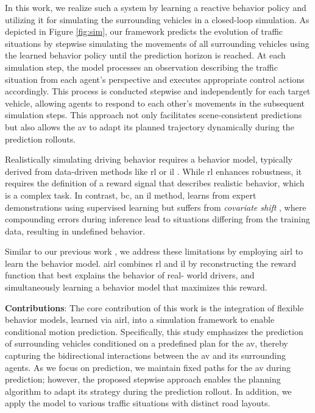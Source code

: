 \documentclass[a4paper,12pt,onecolumn]{article}
\begin{document}
In this work, we realize such a system by learning a reactive behavior policy and utilizing it for simulating the surrounding vehicles in a closed-loop simulation. 
As depicted in Figure \ref{fig:sim}, our framework predicts the evolution of traffic situations by stepwise simulating the movements of all surrounding vehicles using the learned behavior policy until the prediction horizon is reached. 
At each simulation step, the model processes an observation describing the traffic situation from each agent's perspective and executes appropriate control actions accordingly. This process is conducted stepwise and independently for each target vehicle, allowing agents to respond to each other's movements in the subsequent simulation steps. This approach not only facilitates scene-consistent predictions but also allows the \gls{av} to adapt its planned trajectory dynamically during the prediction rollouts.

Realistically simulating driving behavior requires a behavior model, typically derived from data-driven methods like \gls{rl} \cite{Konstantinidis23} or \gls{il} \cite{Sackmann22AIRL}. While \gls{rl} enhances robustness, it requires the definition of a reward signal that describes realistic behavior, which is a complex task. In contrast, \gls{bc}, an \gls{il} method, learns from expert demonstrations using supervised learning but suffers from \emph{covariate shift} \cite{Spencer21}, where compounding errors during inference lead to situations differing from the training data, resulting in undefined behavior.

Similar to our previous work \cite{Konstantinidis24AIRL}, we address these limitations by employing \gls{airl} \cite{Fu17AIRL} to learn the behavior model. \gls{airl} combines \gls{rl} and \gls{il} by reconstructing the reward function that best explains the behavior of real- world drivers, and simultaneously learning a behavior model that maximizes this reward.

\textbf{Contributions}: 
The core contribution of this work is the integration of flexible behavior models, learned via \gls{airl}, into a simulation framework to enable conditional motion prediction. Specifically, this study emphasizes the prediction of surrounding vehicles conditioned on a predefined plan for the \gls{av}, thereby capturing the bidirectional interactions between the \gls{av} and its surrounding agents. As we focus on prediction, we maintain fixed paths for the \gls{av} during prediction; however, the proposed stepwise approach enables the planning algorithm to adapt its strategy during the prediction rollout. In addition, we apply the model to various traffic situations with distinct road layouts. %
\end{document}
